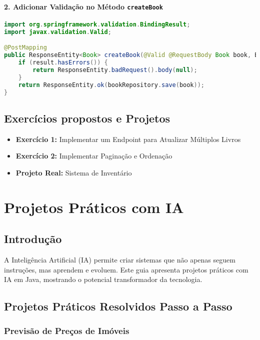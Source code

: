 \documentclass[a4paper,12pt]{book}
\begin{document}
\subsubsection{2. Adicionar Validação no Método \texttt{createBook}}

\begin{lstlisting}[language=Java, caption={Validação no Controlador}]
import org.springframework.validation.BindingResult;
import javax.validation.Valid;

@PostMapping
public ResponseEntity<Book> createBook(@Valid @RequestBody Book book, BindingResult result) {
    if (result.hasErrors()) {
        return ResponseEntity.badRequest().body(null);
    }
    return ResponseEntity.ok(bookRepository.save(book));
}
\end{lstlisting}

\section{Exercícios propostos e Projetos}

\begin{itemize}
    \item \textbf{Exercício 1:} Implementar um Endpoint para Atualizar Múltiplos Livros
    \item \textbf{Exercício 2:} Implementar Paginação e Ordenação
    \item \textbf{Projeto Real:} Sistema de Inventário
\end{itemize}

\chapter{Projetos Práticos com IA}
\section{Introdução}
A Inteligência Artificial (IA) permite criar sistemas que não apenas seguem instruções, mas aprendem e evoluem. Este guia apresenta projetos práticos com IA em Java, mostrando o potencial transformador da tecnologia.

\section{Projetos Práticos Resolvidos Passo a Passo}

\subsection{Previsão de Preços de Imóveis}
\end{document}
